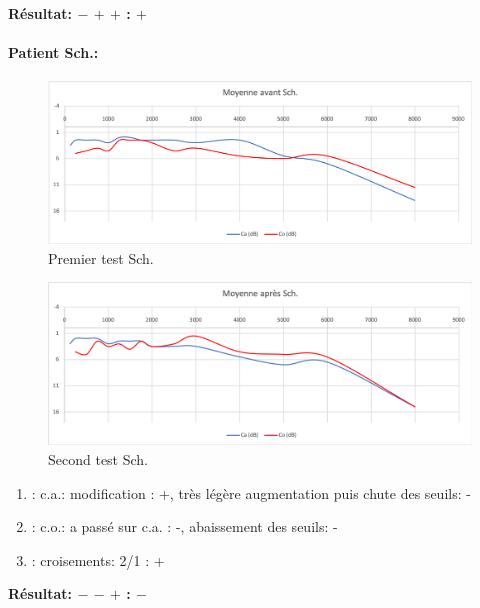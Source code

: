                 \textbf{ Résultat:  $- $  $+ $   $+ $     :   $+$}

\paragraph{Patient Sch.:}
\begin{figure}[th]
\centering
\includegraphics[width=1\linewidth]{images/graphiques/schaff_pre.png}
\caption[Patient Sch. : 1° test]{Premier test Sch.}

\end{figure}


         \begin{figure}[th]
\centering
\includegraphics[width=1\linewidth]{images/graphiques/schaff_post.png}
\caption[Patient Sch.: 2° test]{Second test Sch.}

\label{groupecontroleimage1}
\end{figure}


\begin{enumerate}
	
	\item : c.a.:  modification : +, très légère augmentation puis chute des
	seuils: -
	\item : c.o.: a passé sur c.a. : -, abaissement des seuils:  -
	\item : croisements: 2/1 :     +
\end{enumerate}
\textbf{ Résultat:  $-$    $-$   $+$         :   $-$ }

